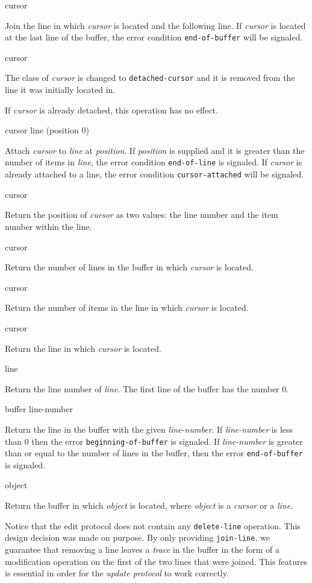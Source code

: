 {cursor}

Join the line in which \textit{cursor} is located and the following
line.  If \textit{cursor} is located at the last line of the buffer,
the error condition \texttt{end-of-buffer} will be signaled.

 {cursor}

The class of \textit{cursor} is changed to \texttt{detached-cursor}
and it is removed from the line it was initially located in. 

If \textit{cursor} is already detached, this operation has no effect.

 {cursor line \optional (position 0)}

Attach \textit{cursor} to \textit{line} at \textit{position}.  If
\textit{position} is supplied and it is greater than the number of
items in \textit{line}, the error condition \texttt{end-of-line} is
signaled.  If \textit{cursor} is already attached to a line, the error
condition \texttt{cursor-attached} will be signaled.

 {cursor}

Return the position of \textit{cursor} as two values: the line number
and the item number within the line. 

 {cursor}

Return the number of lines in the buffer in which \textit{cursor} is
located.

 {cursor}

Return the number of items in the line in which \textit{cursor} is
located.

 {cursor}

Return the line in which \textit{cursor} is located. 

 {line}

Return the line number of \textit{line}.  The first line of the buffer
has the number $0$. 

 {buffer line-number}

Return the line in the buffer with the given \textit{line-number}.  If
\textit{line-number} is less than $0$ then the error
\texttt{beginning-of-buffer} is signaled.  If \textit{line-number} is
greater than or equal to the number of lines in the buffer, then the
error \texttt{end-of-buffer} is signaled.

 {object}

Return the buffer in which \textit{object} is located, where
\textit{object} is a \emph{cursor} or a \emph{line}.

Notice that the edit protocol does not contain any
\texttt{delete-line} operation.  This design decision was made on
purpose.  By only providing \texttt{join-line}, we guarantee that
removing a line leaves a \emph{trace} in the buffer in the form of a
modification operation on the first of the two lines that were
joined.  This features is essential in order for the \emph{update
  protocol} to work correctly.
